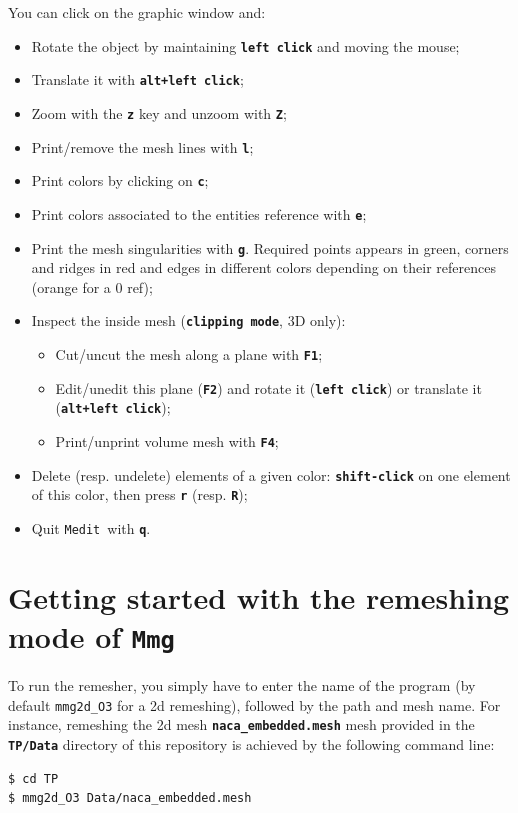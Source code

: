 \documentclass{article}
\newcommand{\ttb}[1]{\texttt{\textbf{#1}}}
\newcommand{\mmg}{\texttt{Mmg}}
\newcommand{\medit}{\texttt{Medit}}
\begin{document}
You can click on the graphic window and:
\begin{itemize}
\item Rotate the object by maintaining \ttb{left click} and moving the mouse;
\item Translate it with \ttb{alt+left click};
\item Zoom with the \ttb{z} key and unzoom with \ttb{Z};
\item Print/remove the mesh lines with \ttb{l};
\item Print colors by clicking on \ttb{c};
\item Print colors associated to the entities reference with \ttb{e};
\item Print the mesh singularities with \ttb{g}. Required points
  appears in green, corners and ridges in red and edges in different colors
  depending on their references (orange for a 0 ref);
\item Inspect the inside mesh (\ttb{clipping mode}, 3D only):
\begin{itemize}
\item Cut/uncut the mesh along a plane with \ttb{F1};
\item Edit/unedit this plane (\ttb{F2}) and rotate it (\ttb{left click}) or translate it (\ttb{alt+left click});
\item Print/unprint volume mesh with \ttb{F4};
\end{itemize}
\item Delete (resp. undelete) elements of a given color:
  \ttb{shift-click} on one element of this color, then press \ttb{r} (resp. \ttb{R});
\item Quit \medit\ with \ttb{q}.
\end{itemize}

\section{Getting started with the remeshing mode of \mmg}
To run the remesher, you simply have to enter the name of the program (by default \texttt{mmg2d\_O3} for a 2d remeshing), 
followed by the path and mesh name. 
For instance, remeshing the 2d mesh \ttb{naca\_embedded.mesh} mesh
provided in the \ttb{TP/Data} directory of this repository is achieved by the following command line:

\begin{lstlisting}[language=bash]
$ cd TP
$ mmg2d_O3 Data/naca_embedded.mesh
\end{lstlisting}
\end{document}
